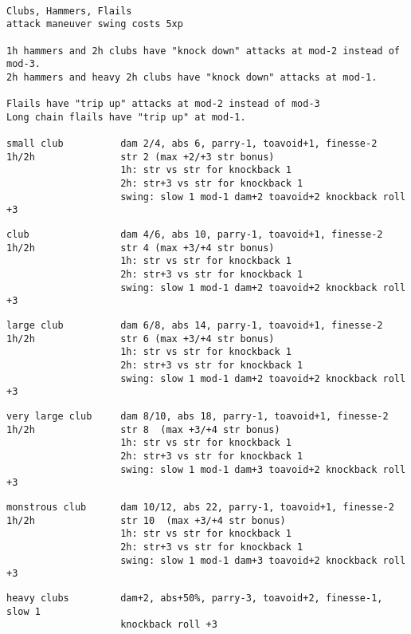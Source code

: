 \

\goodbreak \small \begin{samepage} \begin{verbatim}
Clubs, Hammers, Flails
attack maneuver swing costs 5xp

1h hammers and 2h clubs have "knock down" attacks at mod-2 instead of mod-3.
2h hammers and heavy 2h clubs have "knock down" attacks at mod-1.

Flails have "trip up" attacks at mod-2 instead of mod-3
Long chain flails have "trip up" at mod-1.

small club          dam 2/4, abs 6, parry-1, toavoid+1, finesse-2
1h/2h               str 2 (max +2/+3 str bonus)
                    1h: str vs str for knockback 1
                    2h: str+3 vs str for knockback 1
                    swing: slow 1 mod-1 dam+2 toavoid+2 knockback roll +3
\end{verbatim} \blocklistgap \begin{verbatim}
club                dam 4/6, abs 10, parry-1, toavoid+1, finesse-2
1h/2h               str 4 (max +3/+4 str bonus)
                    1h: str vs str for knockback 1
                    2h: str+3 vs str for knockback 1
                    swing: slow 1 mod-1 dam+2 toavoid+2 knockback roll +3
\end{verbatim} \blocklistgap \begin{verbatim}
large club          dam 6/8, abs 14, parry-1, toavoid+1, finesse-2
1h/2h               str 6 (max +3/+4 str bonus)
                    1h: str vs str for knockback 1
                    2h: str+3 vs str for knockback 1
                    swing: slow 1 mod-1 dam+2 toavoid+2 knockback roll +3
\end{verbatim} \blocklistgap \begin{verbatim}
very large club     dam 8/10, abs 18, parry-1, toavoid+1, finesse-2
1h/2h               str 8  (max +3/+4 str bonus)
                    1h: str vs str for knockback 1
                    2h: str+3 vs str for knockback 1
                    swing: slow 1 mod-1 dam+3 toavoid+2 knockback roll +3
\end{verbatim} \blocklistgap \begin{verbatim}
monstrous club      dam 10/12, abs 22, parry-1, toavoid+1, finesse-2
1h/2h               str 10  (max +3/+4 str bonus)
                    1h: str vs str for knockback 1
                    2h: str+3 vs str for knockback 1
                    swing: slow 1 mod-1 dam+3 toavoid+2 knockback roll +3
\end{verbatim} \blocklistgap \begin{verbatim}
heavy clubs         dam+2, abs+50%, parry-3, toavoid+2, finesse-1, slow 1
                    knockback roll +3
\end{verbatim} \end{samepage} \normalsize \goodbreak

